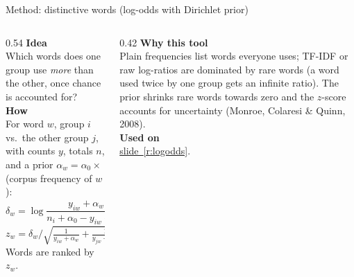 \documentclass[aspectratio=169,10pt]{beamer}
\newcommand{\usedon}[1]{\hyperref[#1]{\textcolor{c4}{slide~\ref*{#1}}}}
\newcommand{\mhead}[1]{\textcolor{c1}{\textbf{#1}}\\[1pt]}
\begin{document}
\begin{frame}{Method: distinctive words (log-odds with Dirichlet prior)}
\begin{columns}[T]
\begin{column}{0.54\textwidth}\footnotesize
\mhead{Idea}
Which words does one group use \emph{more} than the other, once chance is accounted for?\\[4pt]
\mhead{How}
For word $w$, group $i$ vs.\ the other group $j$, with counts $y$, totals $n$, and a prior $\alpha_w = \alpha_0 \times$ (corpus frequency of $w$):
\[\delta_w = \log\frac{y_{iw}+\alpha_w}{n_i+\alpha_0-y_{iw}-\alpha_w} - \log\frac{y_{jw}+\alpha_w}{n_j+\alpha_0-y_{jw}-\alpha_w}\]
\[ z_w = \delta_w \Big/ \sqrt{\tfrac{1}{y_{iw}+\alpha_w}+\tfrac{1}{y_{jw}+\alpha_w}} \]
Words are ranked by $z_w$.
\end{column}
\begin{column}{0.42\textwidth}\footnotesize
\mhead{Why this tool}
Plain frequencies list words everyone uses; TF-IDF or raw log-ratios are dominated by rare words (a word used twice by one group gets an infinite ratio). The prior \alert{shrinks} rare words towards zero and the $z$-score accounts for uncertainty (Monroe, Colaresi \& Quinn, 2008).\\[6pt]
\mhead{Used on}
\usedon{r:logodds}.
\end{column}
\end{columns}
\end{frame}
\end{document}
